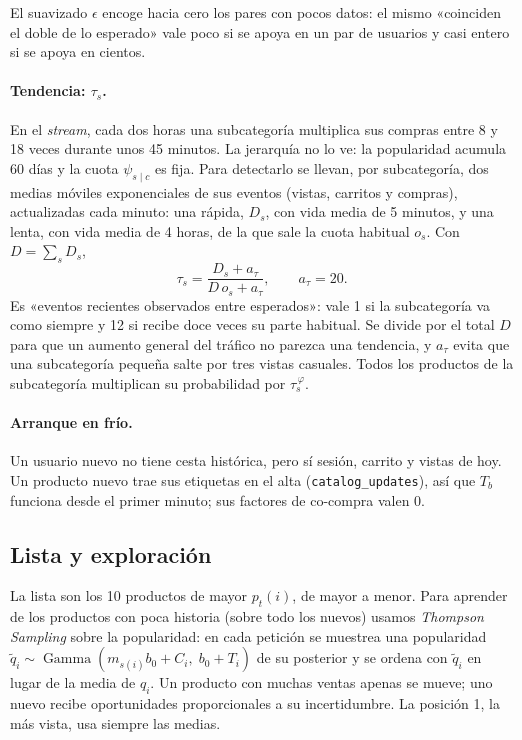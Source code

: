 \documentclass[11pt,a4paper]{article}
\newcommand{\Gam}{\operatorname{Gamma}}
\newcommand{\cod}[1]{\texttt{#1}}
\begin{document}
El suavizado $\epsilon$ encoge hacia cero los pares con pocos datos: el mismo «coinciden el doble de lo
esperado» vale poco si se apoya en un par de usuarios y casi entero si se apoya en cientos.

\paragraph{Tendencia: $\tau_s$.} En el \emph{stream}, cada dos horas una subcategoría multiplica sus
compras entre 8 y 18 veces durante unos 45 minutos. La jerarquía no lo ve: la popularidad acumula 60 días
y la cuota $\psi_{s\mid c}$ es fija. Para detectarlo se llevan, por subcategoría, dos medias móviles
exponenciales de sus eventos (vistas, carritos y compras), actualizadas cada minuto: una rápida, $D_s$,
con vida media de 5 minutos, y una lenta, con vida media de 4 horas, de la que sale la cuota habitual
$o_s$. Con $D=\sum_s D_s$,
\[
\tau_s=\frac{D_s+a_\tau}{D\,o_s+a_\tau},\qquad a_\tau=20 .
\]
Es «eventos recientes observados entre esperados»: vale 1 si la subcategoría va como siempre y 12 si
recibe doce veces su parte habitual. Se divide por el total $D$ para que un aumento general del tráfico
no parezca una tendencia, y $a_\tau$ evita que una subcategoría pequeña salte por tres vistas casuales.
Todos los productos de la subcategoría multiplican su probabilidad por $\tau_s^{\,\varphi}$.

\paragraph{Arranque en frío.} Un usuario nuevo no tiene cesta histórica, pero sí sesión, carrito y vistas
de hoy. Un producto nuevo trae sus etiquetas en el alta (\cod{catalog\_updates}), así que $T_b$ funciona
desde el primer minuto; sus factores de co-compra valen 0.

\subsection{Lista y exploración}

La lista son los 10 productos de mayor $p_t(i)$, de mayor a menor. Para aprender de los productos
con poca historia (sobre todo los nuevos) usamos \emph{Thompson Sampling} sobre la popularidad: en cada
petición se muestrea una popularidad $\tilde q_i\sim\Gam(m_{s(i)}b_0+C_i,\;b_0+T_i)$ de su posterior y se
ordena con $\tilde q_i$ en lugar de la media de $q_i$. Un producto con muchas ventas apenas se mueve; uno nuevo recibe oportunidades proporcionales
a su incertidumbre. La posición 1, la más vista, usa siempre las medias.
\end{document}

